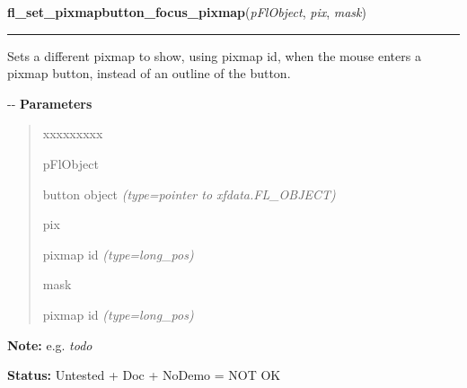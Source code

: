 \hspace{.8\funcindent}\begin{boxedminipage}{\funcwidth}

    \raggedright \textbf{fl\_set\_pixmapbutton\_focus\_pixmap}(\textit{pFlObject}, \textit{pix}, \textit{mask})

    \vspace{-1.5ex}

    \rule{\textwidth}{0.5\fboxrule}
\setlength{\parskip}{2ex}

Sets a different pixmap to show, using pixmap id, when the mouse
enters a pixmap button, instead of an outline of the button.

-{}-
\setlength{\parskip}{1ex}
      \textbf{Parameters}
      \vspace{-1ex}

      \begin{quote}
        \begin{Ventry}{xxxxxxxxx}

          \item[pFlObject]


button object
            {\it (type=pointer to xfdata.FL\_OBJECT)}

          \item[pix]


pixmap id
            {\it (type=long\_pos)}

          \item[mask]


pixmap id
            {\it (type=long\_pos)}

        \end{Ventry}

      \end{quote}

\textbf{Note:} 
e.g. \emph{todo}


\textbf{Status:} 
Untested + Doc + NoDemo = NOT OK


    \end{boxedminipage}

    \label{xformslib:flbutton:fl_get_button}

    \vspace{0.5ex}


